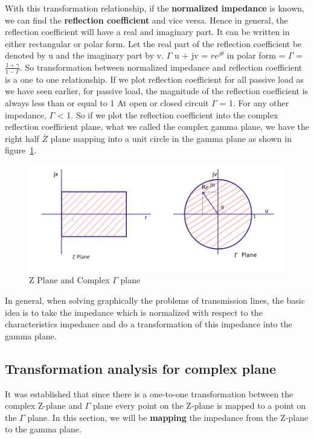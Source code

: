 With this transformation relationship, if the \textbf{normalized impedance} is known, we can find the \textbf{reflection coefficient} and vice versa. Hence in general, the reflection coefficient will have a real and imaginary part. It can be written in either rectangular or polar form. Let the real part of the reflection coefficient be denoted by u and the imaginary part by v. $\Gamma$ u + jv = $re^{j\theta}$ in polar form = $\Gamma$ = $\frac{1 + \gamma}{1-\Gamma}$. So transformation between normalized impedance and reflection coefficient is a one to one relationship. If we plot reflection coefficient for all passive load as we have seen earlier, for passive load, the magnitude of the reflection coefficient is always less than or equal to 1 At open or closed circuit $\Gamma$ = 1. For any other impedance, $\Gamma$ < 1. So if we plot the reflection coefficient into the complex reflection coefficient plane, what we called the complex gamma plane, we have the right half $\bar{Z}$ plane mapping into a unit circle in the gamma plane  as shown in figure~\ref{fig:oiuhgvcx}.
\begin{figure}[h]
\centering
\includegraphics[width=1.05\linewidth]{graphics/plane_transform}
\caption{Z Plane and Complex $\Gamma$ plane}
\label{fig:oiuhgvcx}
\end{figure}

In general, when solving graphically the problems of transmission lines, the basic idea is to take the impedance which is normalized with respect to the characteristics impedance and do a transformation of this impedance into the gamma plane.

\subsection{Transformation analysis for complex plane}
It was established that since there is a one-to-one transformation between the complex Z-plane and $\Gamma$ plane every point on the Z-plane is mapped to a point on the $ \Gamma$ plane. In this section, we will be \textbf{mapping} the impedance from the Z-plane to the gamma plane.

